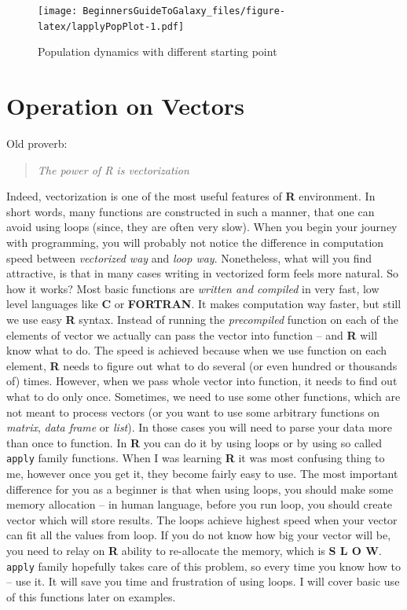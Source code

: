 \documentclass[]{book}
\theoremstyle{definition}
\theoremstyle{definition}
\theoremstyle{definition}
\theoremstyle{remark}
\begin{document}
\begin{figure}
\centering
\texttt{[image: BeginnersGuideToGalaxy\_files/figure-latex/lapplyPopPlot-1.pdf]}
\caption{\label{fig:lapplyPopPlot}Population dynamics with different
starting point}
\end{figure}

\section{Operation on Vectors}\label{operation-on-vectors}

Old proverb:

\begin{quote}
\emph{The power of R is vectorization}
\end{quote}

Indeed, vectorization is one of the most useful features of \textbf{R}
environment. In short words, many functions are constructed in such a
manner, that one can avoid using loops (since, they are often very
slow). When you begin your journey with programming, you will probably
not notice the difference in computation speed between \emph{vectorized
way} and \emph{loop way}. Nonetheless, what will you find attractive, is
that in many cases writing in vectorized form feels more natural. So how
it works? Most basic functions are \emph{written and compiled} in very
fast, low level languages like \textbf{C} or \textbf{FORTRAN}. It makes
computation way faster, but still we use easy \textbf{R} syntax. Instead
of running the \emph{precompiled} function on each of the elements of
vector we actually can pass the vector into function -- and \textbf{R}
will know what to do. The speed is achieved because when we use function
on each element, \textbf{R} needs to figure out what to do several (or
even hundred or thousands of) times. However, when we pass whole vector
into function, it needs to find out what to do only once. Sometimes, we
need to use some other functions, which are not meant to process vectors
(or you want to use some arbitrary functions on \emph{matrix},
\emph{data frame} or \emph{list}). In those cases you will need to parse
your data more than once to function. In \textbf{R} you can do it by
using loops or by using so called \texttt{apply} family functions. When
I was learning \textbf{R} it was most confusing thing to me, however
once you get it, they become fairly easy to use. The most important
difference for you as a beginner is that when using loops, you should
make some memory allocation -- in human language, before you run loop,
you should create vector which will store results. The loops achieve
highest speed when your vector can fit all the values from loop. If you
do not know how big your vector will be, you need to relay on \textbf{R}
ability to re-allocate the memory, which is \textbf{S L O W}.
\texttt{apply} family hopefully takes care of this problem, so every
time you know how to -- use it. It will save you time and frustration of
using loops. I will cover basic use of this functions later on examples.
\end{document}
